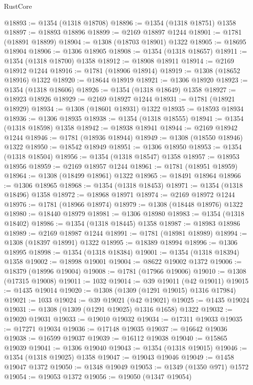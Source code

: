 \begin{lexlean}{RustCore}
\begin{coremodule}
@18893 := @1354 (@1318 @18708)
@18896 := @1354 (@1318 @18751) @1358
@18897 := @18893 @18896
@18899 := @2169 @18897 @1244
@18901 := @1781 (@18891 @18899)
@18904 := @1308 (@18703 @18901) @1322
@18905 := @18695 @18904
@18906 := @1306 @18905
@18908 := @1354 (@1318 @18657)
@18911 := @1354 (@1318 @18700) @1358
@18912 := @18908 @18911
@18914 := @2169 @18912 @1244
@18916 := @1781 (@18906 @18914)
@18919 := @1308 (@18652 @18916) @1322
@18920 := @18644 @18919
@18921 := @1306 @18920
@18923 := @1354 (@1318 @18606)
@18926 := @1354 (@1318 @18649) @1358
@18927 := @18923 @18926
@18929 := @2169 @18927 @1244
@18931 := @1781 (@18921 @18929)
@18934 := @1308 (@18601 @18931) @1322
@18935 := @18593 @18934
@18936 := @1306 @18935
@18938 := @1354 (@1318 @18555)
@18941 := @1354 (@1318 @18598) @1358
@18942 := @18938 @18941
@18944 := @2169 @18942 @1244
@18946 := @1781 (@18936 @18944)
@18949 := @1308 (@18550 @18946) @1322
@18950 := @18542 @18949
@18951 := @1306 @18950
@18953 := @1354 (@1318 @18504)
@18956 := @1354 (@1318 @18547) @1358
@18957 := @18953 @18956
@18959 := @2169 @18957 @1244
@18961 := @1781 (@18951 @18959)
@18964 := @1308 (@18499 @18961) @1322
@18965 := @18491 @18964
@18966 := @1306 @18965
@18968 := @1354 (@1318 @18453)
@18971 := @1354 (@1318 @18496) @1358
@18972 := @18968 @18971
@18974 := @2169 @18972 @1244
@18976 := @1781 (@18966 @18974)
@18979 := @1308 (@18448 @18976) @1322
@18980 := @18440 @18979
@18981 := @1306 @18980
@18983 := @1354 (@1318 @18402)
@18986 := @1354 (@1318 @18445) @1358
@18987 := @18983 @18986
@18989 := @2169 @18987 @1244
@18991 := @1781 (@18981 @18989)
@18994 := @1308 (@18397 @18991) @1322
@18995 := @18389 @18994
@18996 := @1306 @18995
@18998 := @1354 (@1318 @18384)
@19001 := @1354 (@1318 @18394) @1358
@19002 := @18998 @19001
@19004 := @8622 @19002 @1372
@19006 := @18379 (@18996 @19004)
@19008 := @1781 (@17966 @19006)
@19010 := @1308 (@17315 @19008)
@19011 := 1032
@19014 := @39 @19011 (@42 @19011)
@19015 := @1435 @19014
@19020 := @1308 (@1309 (@1291 @19015) @1316 @17984)
@19021 := 1033
@19024 := @39 @19021 (@42 @19021)
@19025 := @1435 @19024
@19031 := @1308 (@1309 (@1291 @19025) @1316 @1658) @1322
@19032 := @19020 @19031
@19033 := @19010 @19032
@19034 := @17311 @19033
@19035 := @17271 @19034
@19036 := @17148 @19035
@19037 := @16642 @19036
@19038 := @16599 @19037
@19039 := @16112 @19038
@19040 := @15865 @19039
@19041 := @1306 @19040
@19043 := @1354 (@1318 @19015)
@19046 := @1354 (@1318 @19025) @1358
@19047 := @19043 @19046
@19049 := @1458 @19047 @1372
@19050 := @1348 @19049
@19053 := @1349 (@1350 @971) @1572
@19054 := @19053 @1372
@19056 := @19050 (@1347 @19054)

\end{coremodule}
\end{lexlean}
